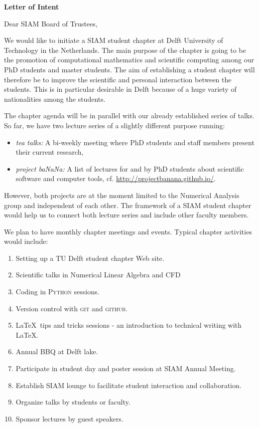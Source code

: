 \documentclass[letterpaper,12pt]{letter}
\begin{document}
\begin{letter}{\textbf{Letter of Intent}}

\opening{Dear SIAM Board of Trustees,}

We would like to initiate a SIAM student chapter at Delft University of Technology in the Netherlands. 
The main purpose of the chapter is going to be the promotion of computational mathematics and scientific computing 
among our PhD students and master students. 
The aim of establishing a student chapter will therefore be to improve the scientific and personal interaction between the students. 
This is in particular desirable in Delft because of a huge variety of nationalities among the students. 

The chapter agenda will be in parallel with our already established series of talks. So far, we have two lecture series of a slightly different purpose running:
\begin{itemize}
 \item \textit{tea talks:} A bi-weekly meeting where PhD students and staff members present their current research,
 \item \textit{project baNaNa:} A list of lectures for and by PhD students about scientific software and computer tools, cf. \href{http://projectbanana.github.io/}{http://projectbanana.github.io/}.
\end{itemize}
However, both projects are at the moment limited to the Numerical Analysis group and independent of each other. 
The framework of a SIAM student chapter would help us to connect both lecture series and include other faculty members. 

We plan to have monthly chapter meetings and events. Typical chapter activities would include:
\begin{enumerate}
\item Setting up a TU Delft student chapter Web site.
\item Scientific talks in Numerical Linear Algebra and CFD
\item Coding in \textsc{Python} sessions.
\newpage
\item Version control with \textsc{git} and \textsc{github}.
\item \LaTeX \ tips and tricks sessions - an introduction to technical writing with \LaTeX.
\item Annual BBQ at Delft lake.
\item Participate in student day and poster session at SIAM Annual Meeting.
\item Establish SIAM lounge to facilitate student interaction and collaboration.
\item Organize talks by students or faculty.
\item Sponsor lectures by guest speakers.
\end{enumerate}


\end{letter}
\end{document}
